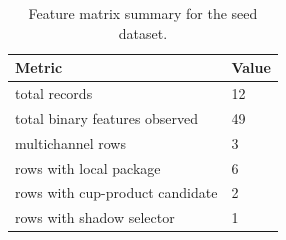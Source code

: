 \begin{table}[h]
\centering
\caption{Feature matrix summary for the seed dataset.}
\label{tab:feature-summary}
\footnotesize
\begin{tabular}{|p{}|p{}|}
\hline
Metric & Value \\
\hline
total records & 12 \\
total binary features observed & 49 \\
multichannel rows & 3 \\
rows with local package & 6 \\
rows with cup-product candidate & 2 \\
rows with shadow selector & 1 \\
\hline
\end{tabular}
\end{table}
